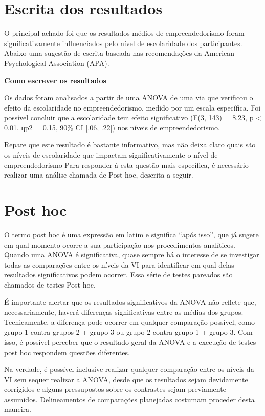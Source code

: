 \documentclass[
]{book}
\begin{document}
\hypertarget{escrita-dos-resultados-4}{%
\section{Escrita dos resultados}\label{escrita-dos-resultados-4}}

O principal achado foi que os resultados médios de empreendedorismo foram significativamente influenciados pelo nível de escolaridade dos participantes. Abaixo uma sugestão de escrita baseada nas recomendações da American Psychological Association (APA).

\textbf{Como escrever os resultados}

Os dados foram analisados a partir de uma ANOVA de uma via que verificou o efeito da escolaridade no empreendedorismo, medido por um escala específica. Foi possível concluir que a escolaridade tem efeito significativo (F(3, 143) = 8.23, p \textless{} 0.01, ηp2 = 0.15, 90\% CI {[}.06, .22{]}) nos níveis de empreendedorismo.

Repare que este resultado é bastante informativo, mas não deixa claro quais são os níveis de escolaridade que impactam significativamente o nível de empreendedorismo Para responder à esta questão mais específica, é necessário realizar uma análise chamada de Post hoc, descrita a seguir.

\hypertarget{post-hoc}{%
\section{Post hoc}\label{post-hoc}}

O termo post hoc é uma expressão em latim e significa ``após isso'', que já sugere em qual momento ocorre a sua participação nos procedimentos analíticos. Quando uma ANOVA é significativa, quase sempre há o interesse de se investigar todas as comparações entre os níveis da VI para identificar em qual delas resultados significativos podem ocorrer. Essa série de testes pareados são chamados de testes Post hoc.

É importante alertar que os resultados significativos da ANOVA não reflete que, necessariamente, haverá diferenças significativas entre as médias dos grupos. Tecnicamente, a diferença pode ocorrer em qualquer comparação possível, como grupo 1 contra grupos 2 + grupo 3 ou grupo 2 contra grupo 1 + grupo 3. Com isso, é possível perceber que o resultado geral da ANOVA e a execução de testes post hoc respondem questões diferentes.

Na verdade, é possível inclusive realizar qualquer comparação entre os níveis da VI sem sequer realizar a ANOVA, desde que os resultados sejam devidamente corrigidos e alguns pressupostos sobre os contrastes sejam previamente assumidos. Delineamentos de comparações planejadas costumam proceder desta maneira.
\end{document}
